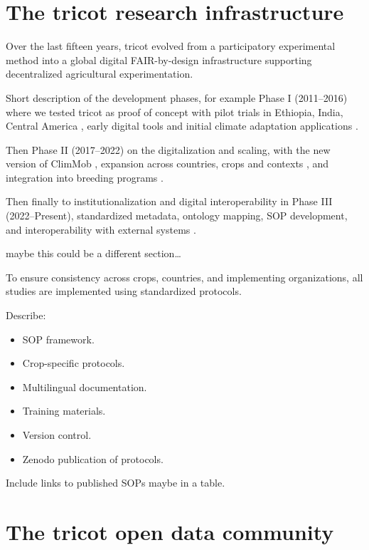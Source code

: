 \documentclass[3p]{elsarticle} %
\providecommand{\tightlist}{%
  \setlength{\itemsep}{0pt}\setlength{\parskip}{0pt}}
\begin{document}
\section{The tricot research
infrastructure}\label{the-tricot-research-infrastructure}

Over the last fifteen years, tricot evolved from a participatory
experimental method into a global digital FAIR-by-design infrastructure
supporting decentralized agricultural experimentation.

Short description of the development phases, for example Phase I
(2011--2016) where we tested tricot as proof of concept with pilot
trials in Ethiopia, India, Central America \citep{vanEtten2016}, early
digital tools \citep{vanEtten2016} and initial climate adaptation
applications \citep{vanEtten2019}.

Then Phase II (2017--2022) on the digitalization and scaling, with the
new version of ClimMob \citep{Quiros2024}, expansion across countries,
crops and contexts
\cite{Brown2022, Donovan2025, Moyo2021, Nanyonjo2024, Olaosebikan2023},
and integration into breeding programs
\citep{Daudi2026, Sharma2025, Kang2025, EmmanuelAlamu2023}.

Then finally to institutionalization and digital interoperability in
Phase III (2022--Present), standardized metadata, ontology mapping, SOP
development, and interoperability with external systems
\citep{Selby2025}.

maybe this could be a different section\ldots{}

To ensure consistency across crops, countries, and implementing
organizations, all studies are implemented using standardized protocols.

Describe:

\begin{itemize}
\tightlist
\item
  SOP framework.
\item
  Crop-specific protocols.
\item
  Multilingual documentation.
\item
  Training materials.
\item
  Version control.
\item
  Zenodo publication of protocols.
\end{itemize}

Include links to published SOPs maybe in a table.

\section{The tricot open data
community}\label{the-tricot-open-data-community}
\end{document}
